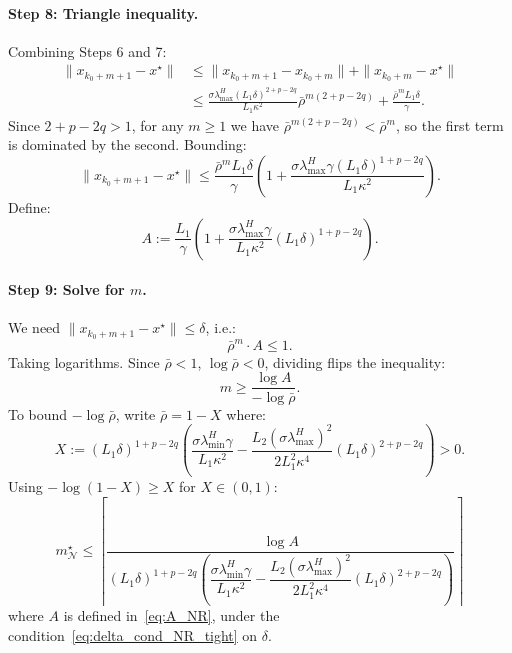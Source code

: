 \documentclass{article}
\begin{document}
\paragraph{Step 8: Triangle inequality.} Combining Steps 6 and 7:
\begin{align*}
\|x_{k_0+m+1} - x^\star\| &\leq \|x_{k_0+m+1} - x_{k_0+m}\| + \|x_{k_0+m} - x^\star\| \\
&\leq \frac{\sigma\lambda_{\max}^H(L_1\delta)^{2+p-2q}}{L_1\kappa^2}\bar{\rho}^{m(2+p-2q)} + \frac{\bar{\rho}^m L_1\delta}{\gamma}.
\end{align*}
Since $2+p-2q > 1$, for any $m \geq 1$ we have $\bar{\rho}^{m(2+p-2q)} < \bar{\rho}^m$, so the first term is dominated by the second. Bounding:
\[
\|x_{k_0+m+1} - x^\star\| \leq \frac{\bar{\rho}^m L_1\delta}{\gamma}\left(1 + \frac{\sigma\lambda_{\max}^H\gamma(L_1\delta)^{1+p-2q}}{L_1\kappa^2}\right).
\]
Define:
\begin{equation}
\label{eq:A_NR}
A := \frac{L_1}{\gamma}\left(1 + \frac{\sigma\lambda_{\max}^H\gamma}{L_1\kappa^2}(L_1\delta)^{1+p-2q}\right).
\end{equation}

\paragraph{Step 9: Solve for $m$.} We need $\|x_{k_0+m+1} - x^\star\| \leq \delta$, i.e.:
\[
\bar{\rho}^m \cdot A \leq 1.
\]
Taking logarithms. Since $\bar{\rho} < 1$, $\log\bar{\rho} < 0$, dividing flips the inequality:
\[
m \geq \frac{\log A}{-\log\bar{\rho}}.
\]
To bound $-\log\bar{\rho}$, write $\bar{\rho} = 1 - X$ where:
\[
X := (L_1\delta)^{1+p-2q}\left(\frac{\sigma\lambda_{\min}^H\gamma}{L_1\kappa^2} - \frac{L_2(\sigma\lambda_{\max}^H)^2}{2L_1^2\kappa^4}(L_1\delta)^{2+p-2q}\right) > 0.
\]
Using $-\log(1 - X) \geq X$ for $X \in (0,1)$:
\begin{equation}
\label{eq:mstar_NR_tight}
\boxed{m^\star_{\mathcal{N}} \leq \left\lceil\frac{\log A}{(L_1\delta)^{1+p-2q}\left(\dfrac{\sigma\lambda_{\min}^H\gamma}{L_1\kappa^2} - \dfrac{L_2(\sigma\lambda_{\max}^H)^2}{2L_1^2\kappa^4}(L_1\delta)^{2+p-2q}\right)}\right\rceil}
\end{equation}
where $A$ is defined in~\eqref{eq:A_NR}, under the condition~\eqref{eq:delta_cond_NR_tight} on $\delta$.
\end{document}
